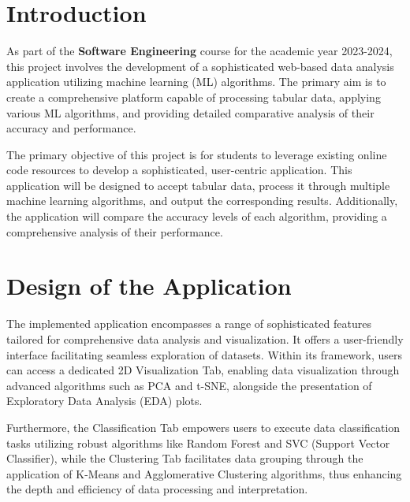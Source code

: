 \documentclass[unnumsec,webpdf,contemporary,large]{oup-authoring-template}%
\theoremstyle{thmstyleone}%
\theoremstyle{thmstyletwo}%
\theoremstyle{thmstylethree}%
\begin{document}

\maketitle


\section{Introduction}
 As part of the \textbf{Software Engineering} course for the academic year 2023-2024, this project involves the development of a sophisticated web-based data analysis application utilizing machine learning (ML) algorithms. The primary aim is to create a comprehensive platform capable of processing tabular data, applying various ML algorithms, and providing detailed comparative analysis of their accuracy and performance. 
\vspace{0.3cm}

The primary objective of this project is for students to leverage existing online code resources to develop a sophisticated, user-centric application. This application will be designed to accept tabular data, process it through multiple machine learning algorithms, and output the corresponding results. Additionally, the application will compare the accuracy levels of each algorithm, providing a comprehensive analysis of their performance.


\section{Design of the Application}\label{sec2}

The implemented application encompasses a range of sophisticated features tailored for comprehensive data analysis and visualization. It offers a user-friendly interface facilitating seamless exploration of datasets. Within its framework, users can access a dedicated 2D Visualization Tab, enabling data visualization through advanced algorithms such as PCA and t-SNE, alongside the presentation of Exploratory Data Analysis (EDA) plots. 
\vspace{0.3cm}

Furthermore, the Classification Tab empowers users to execute data classification tasks utilizing robust algorithms like Random Forest and SVC (Support Vector Classifier), while the Clustering Tab facilitates data grouping through the application of K-Means and Agglomerative Clustering algorithms, thus enhancing the depth and efficiency of data processing and interpretation.
\end{document}
